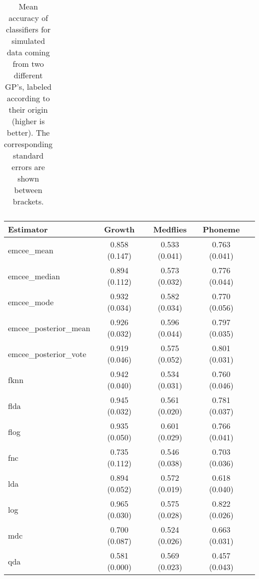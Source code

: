 \begin{table}[htbp!]
\begin{tabular}{lcccc}
\bottomrule
\end{tabular}
  \caption{Mean accuracy of classifiers for simulated data coming from two different GP's, labeled according to their origin (higher is better). The corresponding standard errors are shown between brackets.}
\end{table}

\newpage

\begin{table}[htbp!]
  \centering
  \begin{tabular}{lcccc}
\toprule
            \textbf{Estimator} &            \textbf{Growth} &           \textbf{Medflies} &           \textbf{Phoneme} \\
\midrule

          emcee\_mean & 0.858 (0.147) & 0.533 (0.041) & 0.763 (0.041) \\
        emcee\_median & 0.894 (0.112) & 0.573 (0.032) & 0.776 (0.044) \\
          emcee\_mode & 0.932 (0.034) & 0.582 (0.034) & 0.770 (0.056) \\
emcee\_posterior\_mean & 0.926 (0.032) & 0.596 (0.044) & 0.797 (0.035) \\
emcee\_posterior\_vote & 0.919 (0.046) & 0.575 (0.052) & 0.801 (0.031) \\
                fknn & 0.942 (0.040) & 0.534 (0.031) & 0.760 (0.046) \\
                flda & 0.945 (0.032) & 0.561 (0.020) & 0.781 (0.037) \\
                flog & 0.935 (0.050) & 0.601 (0.029) & 0.766 (0.041) \\
                 fnc & 0.735 (0.112) & 0.546 (0.038) & 0.703 (0.036) \\
                 lda & 0.894 (0.052) & 0.572 (0.019) & 0.618 (0.040) \\
                 log & 0.965 (0.030) & 0.575 (0.028) & 0.822 (0.026) \\
                 mdc & 0.700 (0.087) & 0.524 (0.026) & 0.663 (0.031) \\
                 qda & 0.581 (0.000) & 0.569 (0.023) & 0.457 (0.043) \\

\bottomrule
\toprule


\end{tabular}
\end{table}
